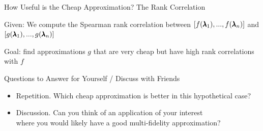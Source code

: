\begin{frame}{How Useful is the Cheap Approximation? The Rank Correlation}

Given:
    We compute the \alert{Spearman rank correlation} between $[f(\pmb{\lambda}_1), ..., f(\pmb{\lambda}_n)]$ and $[g(\pmb{\lambda}_1), ..., g(\pmb{\lambda}_n)]$

\bigskip
\pause
\alert{Goal: find approximations $g$ that are very cheap but have high rank correlations with $f$}

\end{frame}

\begin{frame}{Questions to Answer for Yourself / Discuss with Friends}

\bigskip

\begin{itemize}
    \item \alert{Repetition.} Which cheap approximation is better in this hypothetical case?

\medskip
    \item \alert{Discussion.} 
    Can you think of an application of your interest \\ 
    where you would likely have a good multi-fidelity approximation?

\end{itemize}

\end{frame}

